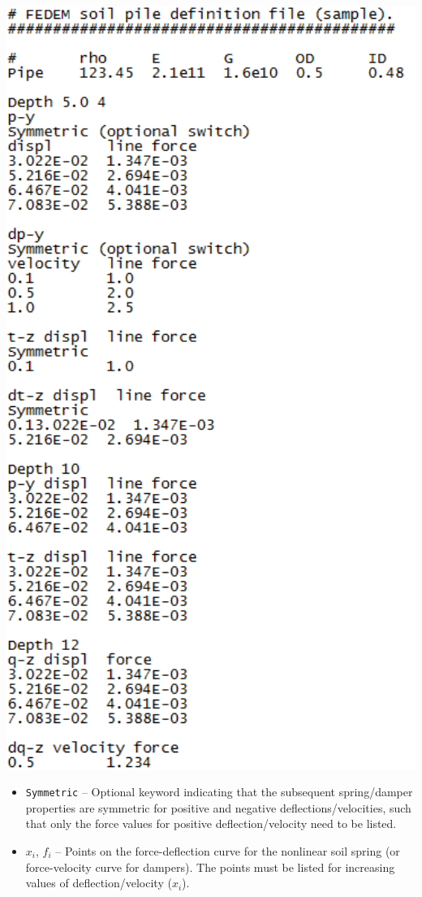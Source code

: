 \begin{minipage}{0.5\textwidth}
\includegraphics[width=1.05\textwidth]{Figures/4a-PileSample}
\end{minipage}

\begin{itemize}
\item{\tt Symmetric} --
  Optional keyword indicating that the subsequent spring/damper properties are
  symmetric for positive and negative deflections/velocities, such that only
  the force values for positive deflection/velocity need to be listed.

\item{$x_i$, $f_i$} --
  Points on the force-deflection curve for the nonlinear soil spring
  (or force-velocity curve for dampers). The points must be listed for
  increasing values of deflection/velocity ($x_i$).
\end{itemize}


